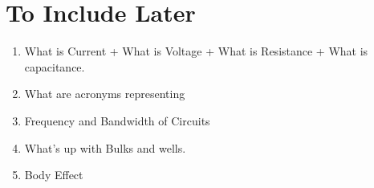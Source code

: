 \documentclass[main]{subfiles}
\begin{document}
\section*{To Include Later}
\begin{enumerate}
    \item What is Current + What is Voltage + What is Resistance + What is capacitance. 
    \item What are acronyms representing
    \item Frequency and Bandwidth of Circuits
    \item What's up with Bulks and wells.
    \item Body Effect

\end{enumerate}
\end{document}
